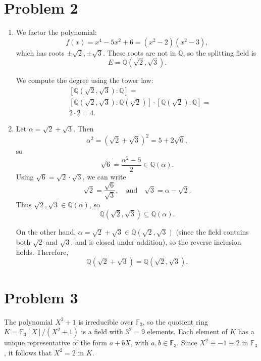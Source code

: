 \documentclass[12pt]{article}
\begin{document}
\section*{Problem 2}
\begin{enumerate}[label=(\arabic*)]

\item We factor the polynomial:
\[
f(x) = x^4 - 5x^2 + 6 = (x^2 - 2)(x^2 - 3),
\]
which has roots \( \pm\sqrt{2}, \pm\sqrt{3} \). These roots are not in \( \mathbb{Q} \), so the splitting field is
\[
E = \mathbb{Q}(\sqrt{2}, \sqrt{3}).
\]

We compute the degree using the tower law:
\[
\begin{aligned}
&[\mathbb{Q}(\sqrt{2}, \sqrt{3}) : \mathbb{Q}] = \\
&[\mathbb{Q}(\sqrt{2}, \sqrt{3}) : \mathbb{Q}(\sqrt{2})] \cdot
[\mathbb{Q}(\sqrt{2}) : \mathbb{Q}] = \\ &2 \cdot 2 = 4.
\end{aligned}
\]

\item
Let \( \alpha = \sqrt{2} + \sqrt{3} \). Then
\[
\alpha^2 = (\sqrt{2} + \sqrt{3})^2 = 5 + 2\sqrt{6},
\]
so
\[
\sqrt{6} = \frac{\alpha^2 - 5}{2} \in \mathbb{Q}(\alpha).
\]
Using \( \sqrt{6} = \sqrt{2} \cdot \sqrt{3} \), we can write
\[
\sqrt{2} = \frac{\sqrt{6}}{\sqrt{3}}, \quad \text{and} \quad \sqrt{3} = \alpha - \sqrt{2}.
\]
Thus \( \sqrt{2}, \sqrt{3} \in \mathbb{Q}(\alpha) \), so
\[
\mathbb{Q}(\sqrt{2}, \sqrt{3}) \subseteq \mathbb{Q}(\alpha).
\]

On the other hand, \( \alpha = \sqrt{2} + \sqrt{3} \in \mathbb{Q}(\sqrt{2}, \sqrt{3}) \) (since the field contains both \( \sqrt{2} \) and \( \sqrt{3} \), and is closed under addition), so the reverse inclusion holds. Therefore,
\[
\mathbb{Q}(\sqrt{2} + \sqrt{3}) = \mathbb{Q}(\sqrt{2}, \sqrt{3}).
\]

\end{enumerate}

\section*{Problem 3}
The polynomial \( X^2 + 1 \) is irreducible over \( \mathbb{F}_3 \), so the quotient ring \( K = \mathbb{F}_3[X]/(X^2 + 1) \) is a field with \( 3^2 = 9 \) elements. Each element of \( K \) has a unique representative of the form \( a + bX \), with \( a, b \in \mathbb{F}_3 \). Since \( X^2 \equiv -1 \equiv 2 \) in \( \mathbb{F}_3 \), it follows that \( X^2 = 2 \) in \( K \).
\end{document}
